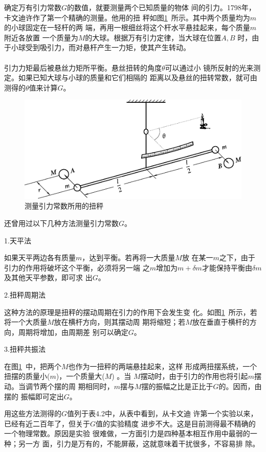 确定万有引力常数$ G $的数值，就要测量两个已知质量的物体
间的引力。1798年，卡文迪许作了第一个精确的测量。他用的扭
秤如图\ref{fig:04.04}~所示。其中两个质量均为$ m $的小球固定在一轻杆的两
端，再用一根细丝将这个杆水平悬挂起来，每个质量$ m $附近各放置
一个质量为$ M $的大球。根据万有引力定律，当大球在位置$ A , B $
时，由于小球受到吸引力，而对悬杆产生一力矩，使其产生转动。\\~\\
引力力矩最后被悬丝力矩所平衡。悬丝扭转的角度$ \theta $可以通过小
镜所反射的光来测定。如果已知大球与小球的质量和它们相隔的
距离以及悬丝的扭转常数，就可由测得的$ \theta $值来计算$ G $。
\begin{figure}[h]
  \centering
  \includegraphics{figure/fig04.04}
  \caption{测量引力常数所用的扭秤}
  \label{fig:04.04}
\end{figure}

还曾用过以下几种方法测量引力常数$ G $。

\textsf{1.天平法}

如果天平两边各有质量$ m $，达到平衡。若再将一大质量$ M $放
在某一$ m $之下，由于引力的作用将破坏这个平衡，必须将另一端
之$ m $增加为$ m + \delta m $才能保持平衡由$ \delta m $及其他天平参数，即可求
出$ G $。

\textsf{2.扭秤周期法}

这种方法的原理是扭秤的摆动周期在引力的作用下会发生变
化。如图\ref{fig:04.04}~所示，若将一个大质量$ M $放在横杆方向，则其摆动周
期将缩短；若$ M $放在垂直于横杆的方向，周期将增加，由周期差
别可以确定$ G $。

\textsf{3.扭秤共振法}

在图\ref{fig:04.04}~中，把两个$ M $也作为一扭秤的两端悬挂起来，这样
形成两扭摆系统，一个扭摆的质量小($ m $)，一个质量大($ M $) 。当
$ M $摆动时，由于引力的作用也将引起$ m $摆动。当调节两个摆的周
期相同时，$ m $摆与$ M $摆的振幅之比是正比于$ G $的。因而，由摆的
振幅即可定出$ G $。

用这些方法测得的$ G $值列于表4.2中，从表中看到，从卡文迪
许第一个实验以来，已经有近二百年了，但关于$ G $值的实验精度
进步不大。这是目前测得最不精确的一个物理常数。原因是实验
很难做，一方面引力是四种基本相互作用中最弱的一种；另一方
面，引力是万有的，不能屏蔽，这就意味着干扰很多，不容易排
除。

